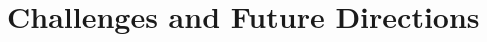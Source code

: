 \documentclass[conference]{IEEEtran}
\begin{document}

\section{Challenges and Future Directions}
\end{document}
